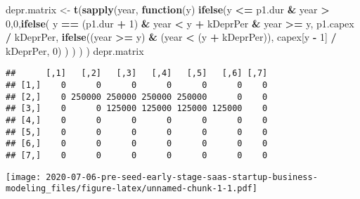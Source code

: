 \documentclass[
]{article}
\newenvironment{Shaded}{\begin{snugshade}}{\end{snugshade}}
\newcommand{\ControlFlowTok}[1]{\textcolor[rgb]{0.13,0.29,0.53}{\textbf{#1}}}
\newcommand{\DataTypeTok}[1]{\textcolor[rgb]{0.13,0.29,0.53}{#1}}
\newcommand{\DecValTok}[1]{\textcolor[rgb]{0.00,0.00,0.81}{#1}}
\newcommand{\FloatTok}[1]{\textcolor[rgb]{0.00,0.00,0.81}{#1}}
\newcommand{\KeywordTok}[1]{\textcolor[rgb]{0.13,0.29,0.53}{\textbf{#1}}}
\newcommand{\NormalTok}[1]{#1}
\newcommand{\OperatorTok}[1]{\textcolor[rgb]{0.81,0.36,0.00}{\textbf{#1}}}
\newcommand{\StringTok}[1]{\textcolor[rgb]{0.31,0.60,0.02}{#1}}
\begin{document}
\begin{Shaded}
\begin{Highlighting}[]
\NormalTok{depr.matrix <-}
\KeywordTok{t}\NormalTok{(}\KeywordTok{sapply}\NormalTok{(year, }\ControlFlowTok{function}\NormalTok{(y)}
\KeywordTok{ifelse}\NormalTok{(y }\OperatorTok{<=}\StringTok{ }\NormalTok{p1.dur }\OperatorTok{&}\StringTok{ }\NormalTok{year }\OperatorTok{>}\StringTok{ }\DecValTok{0}\NormalTok{,}\DecValTok{0}\NormalTok{,}\KeywordTok{ifelse}\NormalTok{(}
\NormalTok{y }\OperatorTok{==}\StringTok{ }\NormalTok{(p1.dur }\OperatorTok{+}\StringTok{ }\DecValTok{1}\NormalTok{) }\OperatorTok{&}\StringTok{ }\NormalTok{year }\OperatorTok{<}\StringTok{ }\NormalTok{y }\OperatorTok{+}\StringTok{ }\NormalTok{kDeprPer }\OperatorTok{&}\StringTok{ }\NormalTok{year }\OperatorTok{>=}\StringTok{ }\NormalTok{y,}
\NormalTok{p1.capex }\OperatorTok{/}\StringTok{ }\NormalTok{kDeprPer,}
\KeywordTok{ifelse}\NormalTok{((year }\OperatorTok{>=}\StringTok{ }\NormalTok{y) }\OperatorTok{&}\StringTok{ }\NormalTok{(year }\OperatorTok{<}\StringTok{ }\NormalTok{(y }\OperatorTok{+}\StringTok{ }\NormalTok{kDeprPer)),}
\NormalTok{capex[y }\OperatorTok{-}\StringTok{ }\DecValTok{1}\NormalTok{] }\OperatorTok{/}\StringTok{ }\NormalTok{kDeprPer, }\DecValTok{0}\NormalTok{)}
\NormalTok{)}
\NormalTok{)}
\NormalTok{)}
\NormalTok{)}
\NormalTok{depr.matrix}
\end{Highlighting}
\end{Shaded}

\begin{verbatim}
##      [,1]   [,2]   [,3]   [,4]   [,5]   [,6] [,7]
## [1,]    0      0      0      0      0      0    0
## [2,]    0 250000 250000 250000 250000      0    0
## [3,]    0      0 125000 125000 125000 125000    0
## [4,]    0      0      0      0      0      0    0
## [5,]    0      0      0      0      0      0    0
## [6,]    0      0      0      0      0      0    0
## [7,]    0      0      0      0      0      0    0
\end{verbatim}

\begin{Shaded}
\end{Shaded}

\texttt{[image: 2020-07-06-pre-seed-early-stage-saas-startup-business-modeling\_files/figure-latex/unnamed-chunk-1-1.pdf]}
\end{document}
